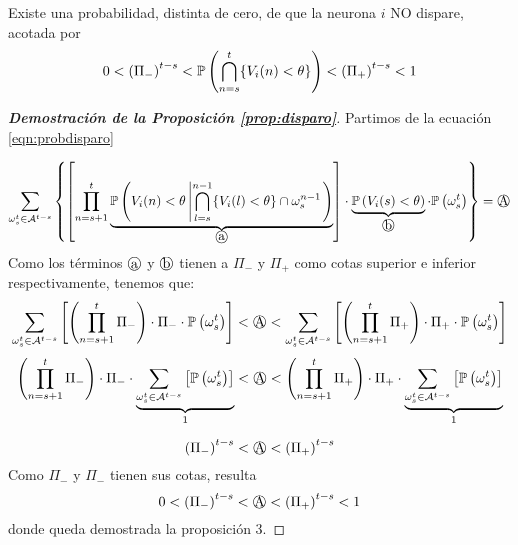 \begin{prop}\label{prop:disparo}
Existe una probabilidad, distinta de cero, de que la neurona $i$ NO dispare, acotada por
\begin{equation}
    0 < \left( \Pi_- \right)^{t-s} < \mathbb{P}\left( \bigcap_{n=s}^t \{V_i(n) < \theta \} \right)  < \left( \Pi_+ \right)^{t-s} < 1
\end{equation}
\end{prop}

\begin{proof}[\bf{Demostración de la Proposición \ref{prop:disparo}}]
Partimos de la ecuación \eqref{eqn:probdisparo}

\begin{equation*}
    \sum_{\omega_s^t \in \mathcal{A}^{t-s}} \left\{  \left[ \prod_{n=s+1}^t
       \underbrace{ \prob{ V_i(n) < \theta \left|  \bigcap_{l=s}^{n-1} \{ V_i(l) < \theta \} \cap \omega_s^{n-1} \right.} }_{\text{\normalsize \textcircled{a}}} \right] \cdot  \underbrace{\prob{ V_i(s) < \theta}}_{\textoCircle{b}} \cdot \prob{\omega_s^t} \right\} = \textoCircle{A}
\end{equation*}
Como los términos $\textoCircle{a}$ y $\textoCircle{b}$ tienen a $\Pi_-$ y $\Pi_+$ como cotas superior e inferior respectivamente, tenemos que:
\begin{equation*}
    \sum_{\omega_s^t \in \mathcal{A}^{t-s}} \left[ \left( \prod_{n=s+1}^t
       \Pi_- \right) \cdot  \Pi_- \cdot \prob{\omega_s^t} \right]
       < \textoCircle{A} <
    \sum_{\omega_s^t \in \mathcal{A}^{t-s}} \left[ \left( \prod_{n=s+1}^t 
       \Pi_+ \right) \cdot  \Pi_+ \cdot \prob{\omega_s^t} \right]
\end{equation*}
\begin{equation*}
    \left( \prod_{n=s+1}^t \Pi_- \right) \cdot  \Pi_- \cdot \underbrace{\sum_{\omega_s^t \in \mathcal{A}^{t-s}} \left[ \prob{\omega_s^t} \right]}_{1}
       < \textoCircle{A} <
    \left( \prod_{n=s+1}^t \Pi_+ \right) \cdot  \Pi_+ \cdot \underbrace{\sum_{\omega_s^t \in \mathcal{A}^{t-s}} \left[ \prob{\omega_s^t} \right]}_{1}
\end{equation*}

\begin{equation}
    \left(\Pi_-\right)^{t-s} < \textoCircle{A} <
    \left(\Pi_+ \right)^{t-s} 
\end{equation}
Como $\Pi_-$ y $\Pi_-$ tienen sus cotas, resulta
\begin{equation}
    0<\left(\Pi_-\right)^{t-s} < \textoCircle{A} <
    \left(\Pi_+ \right)^{t-s} <1
\end{equation}
donde queda demostrada la proposición 3.
\end{proof}

